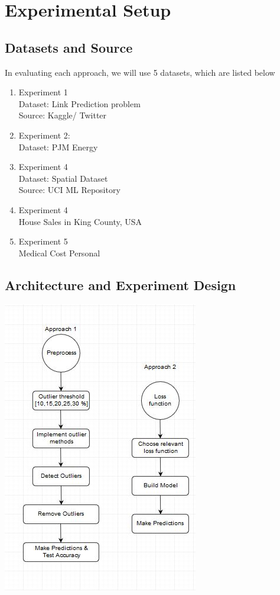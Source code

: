 \documentclass[runningheads]{llncs}
\begin{document}
\section{Experimental Setup}
\subsection{Datasets and Source}

In evaluating each approach, we will use 5 datasets, which are listed below

\begin{enumerate}
    \item Experiment 1 \\
    Dataset: Link Prediction problem \\
    Source: Kaggle/ Twitter
    \item Experiment 2: \\
    Dataset: PJM Energy
    \item Experiment 4 \\
    Dataset: Spatial Dataset \\
    Source: UCI ML Repository
    \item Experiment 4\\
    House Sales in King County, USA
    \item Experiment 5 \\
    Medical Cost Personal \\
\end{enumerate}

\subsection{Architecture and Experiment Design}

\includegraphics[scale=0.7]{arch.JPG}
\end{document}
